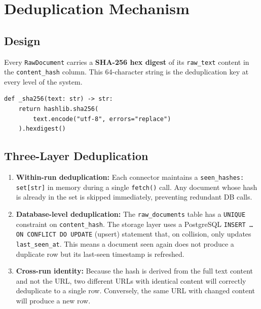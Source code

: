 \documentclass[12pt,a4paper]{article}
\begin{document}
\section{Deduplication Mechanism}
\label{sec:dedup}

\subsection{Design}

Every \texttt{RawDocument} carries a \textbf{SHA-256 hex digest} of its \texttt{raw\_text} content in the \texttt{content\_hash} column. This 64-character string is the deduplication key at every level of the system.

\begin{lstlisting}[caption={SHA-256 content hash computation (shared across all connectors)}]
def _sha256(text: str) -> str:
    return hashlib.sha256(
        text.encode("utf-8", errors="replace")
    ).hexdigest()
\end{lstlisting}

\subsection{Three-Layer Deduplication}

\begin{enumerate}[noitemsep]
  \item \textbf{Within-run deduplication:} Each connector maintains a \texttt{seen\_hashes: set[str]} in memory during a single \texttt{fetch()} call. Any document whose hash is already in the set is skipped immediately, preventing redundant DB calls.

  \item \textbf{Database-level deduplication:} The \texttt{raw\_documents} table has a \texttt{UNIQUE} constraint on \texttt{content\_hash}. The storage layer uses a PostgreSQL \texttt{INSERT \ldots ON CONFLICT DO UPDATE} (upsert) statement that, on collision, only updates \texttt{last\_seen\_at}. This means a document seen again does not produce a duplicate row but its last-seen timestamp is refreshed.

  \item \textbf{Cross-run identity:} Because the hash is derived from the full text content and not the URL, two different URLs with identical content will correctly deduplicate to a single row. Conversely, the same URL with changed content will produce a new row.
\end{enumerate}
\end{document}
